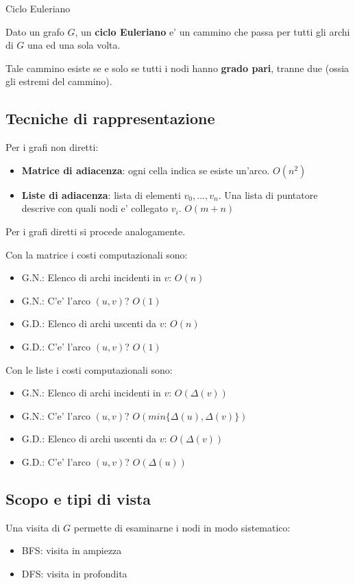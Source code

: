 \begin{definition}{Ciclo Euleriano}

    Dato un grafo $G$, un \textbf{ciclo Euleriano} e' un cammino che passa
    per tutti gli archi di $G$ una ed una sola volta.

    Tale cammino esiste se e solo se tutti i nodi hanno \textbf{grado pari}, tranne due (ossia 
    gli estremi del cammino).
\end{definition}

\subsection{Tecniche di rappresentazione}

    Per i grafi non diretti:
    \begin{itemize}
        \item \textbf{Matrice di adiacenza}: ogni cella indica se esiste un'arco. $O(n^2)$
        \item \textbf{Liste di adiacenza}: lista di elementi $v_0,...,v_n$. Una lista di puntatore 
        descrive con quali nodi e' collegato $v_i$. $O(m+n)$
    \end{itemize}

    Per i grafi diretti si procede analogamente.

    Con la matrice i costi computazionali sono:
    \begin{itemize}
        \item G.N.: Elenco di archi incidenti in $v$: $O(n)$
        \item G.N.: C'e' l'arco $(u,v)$? $O(1)$
        \item G.D.: Elenco di archi uscenti da $v$: $O(n)$
        \item G.D.: C'e' l'arco $(u,v)$? $O(1)$
    \end{itemize}

    Con le liste i costi computazionali sono:
    \begin{itemize}
        \item G.N.: Elenco di archi incidenti in $v$: $O(\Delta(v))$
        \item G.N.: C'e' l'arco $(u,v)$? $O(min\{\Delta(u), \Delta(v)\})$
        \item G.D.: Elenco di archi uscenti da $v$: $O(\Delta(v))$
        \item G.D.: C'e' l'arco $(u,v)$? $O(\Delta(u))$
    \end{itemize}

\subsection{Scopo e tipi di vista}
Una visita di $G$ permette di esaminarne i nodi in modo sistematico:
\begin{itemize}
    \item BFS: visita in ampiezza
    \item DFS: visita in profondita
\end{itemize}

